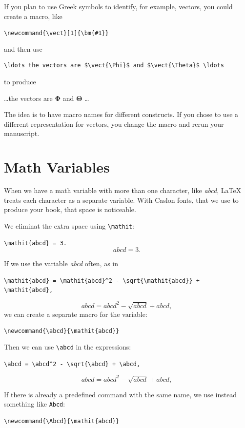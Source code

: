 \documentclass{book}\usepackage[]{graphicx}\usepackage[]{color}
\begin{document}
\blankline
If you plan to use Greek symbols to identify, for example, vectors, you could
create a macro, like

\verb+\newcommand{\vect}[1]{\bm{#1}}+

\newcommand{\vect}[1]{\bm{#1}}

and then use

\noindent
\begin{verbatim}
\ldots the vectors are $\vect{\Phi}$ and $\vect{\Theta}$ \ldots
\end{verbatim}

to produce

\noindent
\ldots the vectors are $\vect{\Phi}$ and $\vect{\Theta}$ \ldots

\blankline
The idea is to have macro names for different constructs.
If you chose to use a different representation for vectors,
you change the macro and rerun your manuscript.


\section{Math Variables}

When we have a math variable with more than one character,
like \textit{abcd}, \LaTeX{} treats each character as a separate variable.
With Caslon fonts, that we use to produce your book, that space is noticeable.

We eliminat the extra space using \verb+\mathit+:

\verb+\mathit{abcd} = 3.+
$$
\mathit{abcd} = 3.
$$

If we use the variable \textit{abcd} often, as in

\verb|\mathit{abcd} = \mathit{abcd}^2 - \sqrt{\mathit{abcd}} + \mathit{abcd},|

$$
\mathit{abcd} = \mathit{abcd}^2 - \sqrt{\mathit{abcd}} + \mathit{abcd},
$$
we can create a separate macro for the variable:

\verb+\newcommand{\abcd}{\mathit{abcd}}+
\newcommand{\abcd}{\mathit{abcd}}

\noindent
Then we can use \verb+\abcd+ in the expressions:

\verb|\abcd = \abcd^2 - \sqrt{\abcd} + \abcd,|

$$
\abcd = \abcd^2 - \sqrt{\abcd} + \abcd,
$$

If there is already a predefined command with the same name,
we use instead something like \verb+Abcd+:

\verb+\newcommand{\Abcd}{\mathit{abcd}}+
\newcommand{\Abcd}{\mathit{abcd}}
\end{document}
